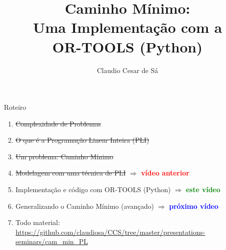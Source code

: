 \documentclass{beamer}
\title[Inteligência Artificial -- Otimização Combinatória] %
{Caminho Mínimo: \\ Uma Implementação com a \\ OR-TOOLS (Python)}
\author[Claudio Cesar de Sá] %
{Claudio Cesar de Sá\inst{1}}
\institute[UDESC]{Pesquisador Independente}
\date[\today] %
\begin{document}
\begin{frame}
  \titlepage
\end{frame}








\begin{frame}

\begin{block}{Roteiro}

\begin{enumerate}

  \item  \sout{Complexidade de Problemas}
  \item  \sout{ O que é a Programação Linear Inteira (PLI)}
  \item   \sout{ Um problema:  Caminho Mínimo}
  \item   \sout{ Modelagem com uma técnica de PLI } $\Rightarrow$ \textbf{\textcolor{red}{vídeo anterior }}
  \item  Implementação e código com OR-TOOLS (Python) $\Rightarrow$  \textbf{\textcolor{green}{este vídeo}} 
  \item  Generalizando o Caminho Mínimo (avançado) $\Rightarrow$ \textbf{\textcolor{blue}{próximo vídeo}} 
  \item Todo material: \url{https://github.com/claudiosa/CCS/tree/master/presentations-seminars/cam_min_PL}
  \end{enumerate}

\end{block}

\end{frame}
\end{document}
